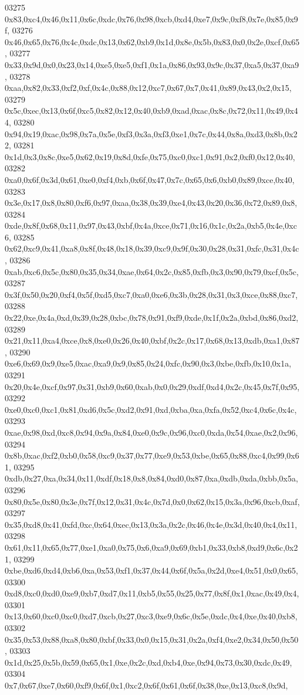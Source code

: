\begin{DoxyCode}
03275   0x83,0xc4,0x46,0x11,0x6c,0xdc,0x76,0x98,0xcb,0xd4,0xe7,0x9c,0xf8,0x7e,0x85,0x9f,
03276   0x46,0x65,0x76,0x4c,0xdc,0x13,0x62,0xb9,0x1d,0x8e,0x5b,0x83,0x0,0x2e,0xcf,0x65,
03277   0x33,0x9d,0x0,0x23,0x14,0xe5,0xe5,0xf1,0x1a,0x86,0x93,0x9c,0x37,0xa5,0x37,0xa9,
03278   0xaa,0x82,0x33,0xf2,0xf,0x4c,0x88,0x12,0xc7,0x67,0x7,0x41,0x89,0x43,0x2,0x15,
03279   0x5c,0xec,0x13,0x6f,0xc5,0x82,0x12,0x40,0xb9,0xad,0xac,0x8c,0x72,0x11,0x49,0x44,
03280   0x94,0x19,0xac,0x98,0x7a,0x5e,0xf3,0x3a,0xf3,0xe1,0x7c,0x44,0x8a,0xd3,0x8b,0x22,
03281   0x1d,0x3,0x8c,0xe5,0x62,0x19,0x8d,0xfe,0x75,0xc0,0xc1,0x91,0x2,0xf0,0x12,0x40,
03282   0xa0,0x6f,0x3d,0x61,0xe0,0xf4,0xb,0x6f,0x47,0x7c,0x65,0x6,0xb0,0x89,0xce,0x40,
03283   0x3e,0x17,0x8,0x80,0xf6,0x97,0xaa,0x38,0x39,0xe4,0x43,0x20,0x36,0x72,0x89,0x8,
03284   0xde,0x8f,0x68,0x11,0x97,0x43,0xbf,0x4a,0xce,0x71,0x16,0x1c,0x2a,0xb5,0x4e,0xc6,
03285   0x62,0xc9,0x41,0xa8,0x8f,0x48,0x18,0x39,0xc9,0x9f,0x30,0x28,0x31,0xfc,0x31,0x4c,
03286   0xab,0xc6,0x5c,0x80,0x35,0x34,0xae,0x64,0x2c,0x85,0xfb,0x3,0x90,0x79,0xcf,0x5c,
03287   0x3f,0x50,0x20,0xf4,0x5f,0xd5,0xc7,0xa0,0xe6,0x3b,0x28,0x31,0x3,0xce,0x88,0xc7,
03288   0x22,0xe,0x4a,0xd,0x39,0x28,0xbc,0x78,0x91,0xf9,0xde,0x1f,0x2a,0xbd,0x86,0xd2,
03289   0x21,0x11,0xa4,0xce,0x8,0xe0,0x26,0x40,0xbf,0x2c,0x17,0x68,0x13,0xdb,0xa1,0x87,
03290   0xe6,0x69,0x9,0xe5,0xac,0xa9,0x9,0x85,0x24,0xfc,0x90,0x3,0xbe,0xfb,0x10,0x1a,
03291   0x20,0x4e,0xcf,0x97,0x31,0xb9,0x60,0xab,0x0,0x29,0xdf,0xd4,0x2c,0x45,0x7f,0x95,
03292   0xe0,0xc0,0xc1,0x81,0xd6,0x5c,0xd2,0x91,0xd,0xba,0xa,0xfa,0x52,0xc4,0x6c,0x4c,
03293   0xae,0x98,0xd,0xc8,0x94,0x9a,0x84,0xe0,0x9c,0x96,0xc0,0xda,0x54,0xae,0x2,0x96,
03294   0x8b,0xac,0xf2,0xb0,0x58,0xc9,0x37,0x77,0xe9,0x53,0xbe,0x65,0x88,0xc4,0x99,0x61,
03295   0xdb,0x27,0xa,0x34,0x11,0xdf,0x18,0x8,0x84,0xd0,0x87,0xa,0xdb,0xda,0xbb,0x5a,
03296   0x80,0x5e,0x80,0x3e,0x7f,0x12,0x31,0x4c,0x7d,0x0,0x62,0x15,0x3a,0x96,0xcb,0xaf,
03297   0x35,0xd8,0x41,0xfd,0xc,0x64,0xec,0x13,0x3a,0x2c,0x46,0x4e,0x3d,0x40,0x4,0x11,
03298   0x61,0x11,0x65,0x77,0xe1,0xa0,0x75,0x6,0xa9,0x69,0xb1,0x33,0xb8,0xd9,0x6c,0x21,
03299   0xbe,0xd6,0xd4,0xb6,0xa,0x53,0xf1,0x37,0x44,0x6f,0x5a,0x2d,0xe4,0x51,0x0,0x65,
03300   0xd8,0xc0,0xd0,0xe9,0xb7,0xd7,0x11,0xb5,0x55,0x25,0x77,0x8f,0x1,0xac,0x49,0x4,
03301   0x13,0x60,0xc0,0xc0,0xd7,0xcb,0x27,0xc3,0xe9,0x6c,0x5e,0xdc,0x4,0xe,0x40,0xb8,
03302   0x35,0x53,0x88,0xa8,0x80,0xbf,0x33,0x0,0x15,0x31,0x2a,0xf4,0xe2,0x34,0x50,0x50,
03303   0x1d,0x25,0x5b,0x59,0x65,0x1,0xe,0x2c,0xd,0xb4,0xe,0x94,0x73,0x30,0xdc,0x49,
03304   0x7,0x67,0xe7,0x60,0xf9,0x6f,0x1,0xc2,0x6f,0x61,0x6f,0x38,0xe,0x13,0xc8,0x9d,

\end{DoxyCode}
